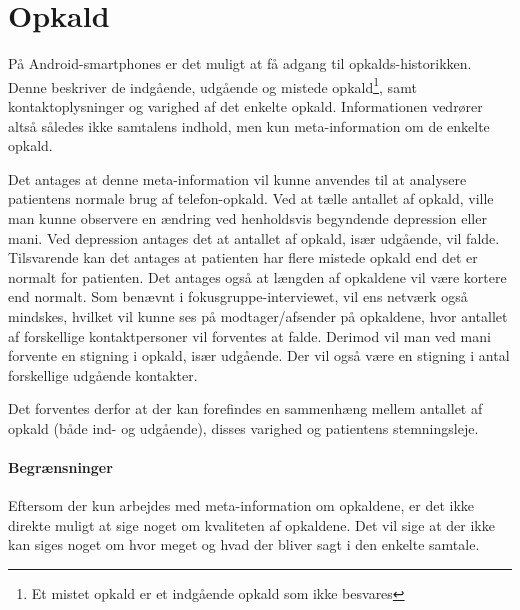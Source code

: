 \section{Opkald}\label{datasamling:opkald}
På Android-smartphones er det muligt at få adgang til opkalds-historikken.
Denne beskriver de indgående, udgående og mistede opkald\footnote{Et mistet opkald er et indgående opkald som ikke besvares}, samt kontaktoplysninger og varighed af det enkelte opkald.
Informationen vedrører altså således ikke samtalens indhold, men kun meta-information om de enkelte opkald.

Det antages at denne meta-information vil kunne anvendes til at analysere patientens normale brug af telefon-opkald.
Ved at tælle antallet af opkald, ville man kunne observere en ændring ved henholdsvis begyndende depression eller mani.
Ved depression antages det at antallet af opkald, især udgående, vil falde.
Tilsvarende kan det antages at patienten har flere mistede opkald end det er normalt for patienten.
Det antages også at længden af opkaldene vil være kortere end normalt.
Som benævnt i fokusgruppe-interviewet, vil ens netværk også mindskes, hvilket vil kunne ses på modtager/afsender på opkaldene, hvor antallet af forskellige kontaktpersoner vil forventes at falde.
Derimod vil man ved mani forvente en stigning i opkald, især udgående.
Der vil også være en stigning i antal forskellige udgående kontakter.

Det forventes derfor at der kan forefindes en sammenhæng mellem antallet af opkald (både ind- og udgående), disses varighed og patientens stemningsleje.

\paragraph{Begrænsninger}
Eftersom der kun arbejdes med meta-information om opkaldene, er det ikke direkte muligt at sige noget om kvaliteten af opkaldene.
Det vil sige at der ikke kan siges noget om hvor meget og hvad der bliver sagt i den enkelte samtale.